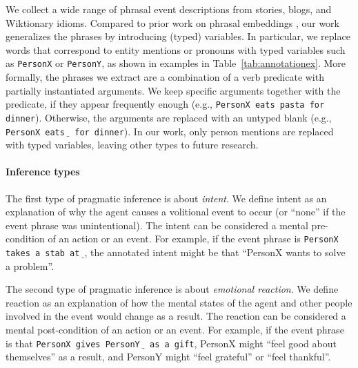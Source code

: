 \documentclass[11pt,a4paper]{article}
\newcommand{\blank}{$\underbar{ }\underbar{ }$\xspace}
\begin{document}
We collect a wide range of phrasal event descriptions from stories, blogs, and Wiktionary  idioms. Compared to prior work on phrasal embeddings \cite{Wieting2015FromPD,Pavlick2015PPDB2B}, our work  generalizes the phrases by introducing (typed) variables. In particular, we replace words that correspond to entity mentions or pronouns with typed variables such as \texttt{PersonX} or \texttt{PersonY}, as shown in examples in Table~\ref{tab:annotationex}. More formally, the phrases we extract are a combination of a verb predicate with partially instantiated arguments. We keep specific arguments   together with the predicate, if they appear frequently enough (e.g., \texttt{PersonX eats pasta for dinner}). Otherwise, the arguments are replaced with an untyped blank (e.g., \texttt{PersonX eats \blank for dinner}). In our work, only person mentions are replaced with typed variables, leaving other types to future research.



\paragraph{Inference types} 
The first type of pragmatic inference is about \textit{intent}.
We define intent as an explanation of why the agent causes a volitional event to occur (or ``none'' if the event phrase was unintentional). The intent can be considered a mental pre-condition of an action or an event.  For example, if the event phrase is \texttt{PersonX takes a stab at \blank}, the annotated intent might be that ``PersonX wants to solve a problem''.

The second type of pragmatic inference is about \textit{emotional reaction}. 
We define reaction as an explanation of how the mental states of the agent and other people involved in the event would change as a result. The reaction can be considered a mental post-condition of an action or an event.  For example, if the event phrase is that \texttt{PersonX gives PersonY \blank as a gift}, PersonX might ``feel good about themselves'' as a result, and PersonY might ``feel grateful'' or ``feel thankful''.
\end{document}
